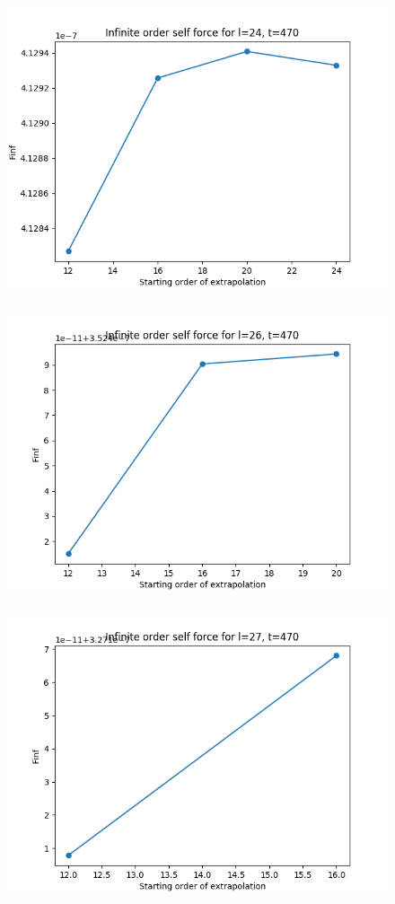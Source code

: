 \documentclass{article}
\begin{document}
\begin{figure}
  \includegraphics{bestfinfselectorplott470l24}
\end{figure}
\begin{figure}
  \includegraphics{bestfinfselectorplott470l26}
\end{figure}
\begin{figure}
  \includegraphics{bestfinfselectorplott470l27}
\end{figure}
\end{document}
